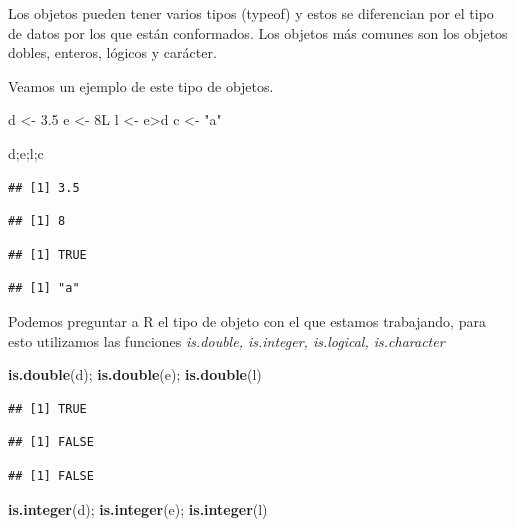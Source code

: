 \documentclass[]{article}
\newenvironment{Shaded}{\begin{snugshade}}{\end{snugshade}}
\newcommand{\KeywordTok}[1]{\textcolor[rgb]{0.13,0.29,0.53}{\textbf{{#1}}}}
\newcommand{\FloatTok}[1]{\textcolor[rgb]{0.00,0.00,0.81}{{#1}}}
\newcommand{\StringTok}[1]{\textcolor[rgb]{0.31,0.60,0.02}{{#1}}}
\newcommand{\NormalTok}[1]{{#1}}
\begin{document}
Los objetos pueden tener varios tipos (typeof) y estos se diferencian
por el tipo de datos por los que están conformados. Los objetos más
comunes son los objetos dobles, enteros, lógicos y carácter.

Veamos un ejemplo de este tipo de objetos.

\begin{Shaded}
\begin{Highlighting}[]
\NormalTok{d <-}\StringTok{ }\FloatTok{3.5}
\NormalTok{e <-}\StringTok{ }\NormalTok{8L}
\NormalTok{l <-}\StringTok{ }\NormalTok{e>d}
\NormalTok{c <-}\StringTok{ "a"}

\NormalTok{d;e;l;c}
\end{Highlighting}
\end{Shaded}

\begin{verbatim}
## [1] 3.5
\end{verbatim}

\begin{verbatim}
## [1] 8
\end{verbatim}

\begin{verbatim}
## [1] TRUE
\end{verbatim}

\begin{verbatim}
## [1] "a"
\end{verbatim}

Podemos preguntar a R el tipo de objeto con el que estamos trabajando,
para esto utilizamos las funciones \emph{is.double, is.integer,
is.logical, is.character}

\begin{Shaded}
\begin{Highlighting}[]
\KeywordTok{is.double}\NormalTok{(d); }\KeywordTok{is.double}\NormalTok{(e); }\KeywordTok{is.double}\NormalTok{(l)}
\end{Highlighting}
\end{Shaded}

\begin{verbatim}
## [1] TRUE
\end{verbatim}

\begin{verbatim}
## [1] FALSE
\end{verbatim}

\begin{verbatim}
## [1] FALSE
\end{verbatim}

\begin{Shaded}
\begin{Highlighting}[]
\KeywordTok{is.integer}\NormalTok{(d); }\KeywordTok{is.integer}\NormalTok{(e); }\KeywordTok{is.integer}\NormalTok{(l)}
\end{Highlighting}
\end{Shaded}
\end{document}
